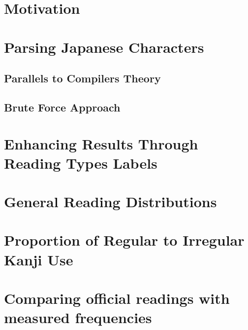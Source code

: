 \section{Motivation}
\section{Parsing Japanese Characters}
\subsection{Parallels to Compilers Theory}
\subsection{Brute Force Approach}
\section{Enhancing Results Through Reading Types Labels}
\section{General Reading Distributions}
\section{Proportion of Regular to Irregular Kanji Use}
\section{Comparing official readings with measured frequencies}